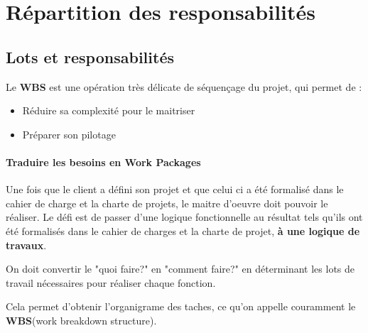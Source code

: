 \section{Répartition des responsabilités}

\subsection{Lots et responsabilités}
Le \textbf{WBS} est une opération très délicate de séquençage du projet, qui permet de :
\begin{itemize}
	\item Réduire sa complexité pour le maitriser
	\item Préparer son pilotage
\end{itemize}
\paragraph*{Traduire les besoins en Work Packages}
Une fois que le client a défini son projet et que celui ci a été formalisé dans le cahier de charge et la charte de projets, le maitre d'oeuvre doit pouvoir le réaliser. Le défi est de passer d'une logique fonctionnelle au résultat tels qu'ils ont été formalisés dans le cahier de charges et la charte de projet, \textbf{à une logique de travaux}.

On doit convertir le "quoi faire?" en "comment faire?" en déterminant les lots de travail nécessaires pour réaliser chaque fonction.

Cela permet d'obtenir l'organigrame des taches, ce qu'on appelle couramment le \textbf{WBS}(work breakdown structure).\\

